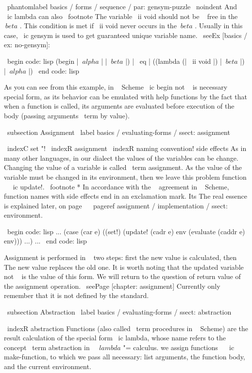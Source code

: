 {\ phantomlabel {basics / forms / sequence / par: gensym-puzzle}
\ noindent
And ~ \ ic {lambda} can also \ footnote {The variable \ ii {void} should not be ~ free
in the $ \ beta $ . This condition is met if \ ii {void} never occurs
in the $ \ beta $ . Usually in this case, \ ic {gensym} is used to get
guaranteed unique variable name. \ seeEx [basics / ex: no-gensym]}:

\ begin {code: lisp}
(begin | $ \ alpha $ | | $ \ beta $ |) | \ eq | ((lambda (| \ ii {void} |) | $ \ beta $ |) | $ \ alpha $ |)
\ end {code: lisp}

As you can see from this example, in ~ Scheme \ ic {begin} not ~ is necessary
special form, as its behavior can be emulated with help
functions by the fact that when a function is called, its arguments are evaluated before
execution of the body (passing arguments \ term {by value}).


\ subsection {Assignment} \ label {basics / evaluating-forms / ssect: assignment}

\ indexC {set "!}
\ indexR {assignment}
\ indexR {naming convention! side effects}
As in many other languages, in our dialect the values ​​of the variables can be
change. Changing the value of a variable is called \ term {assignment}. As
the value of the variable must be changed in its environment, then we leave this problem
function ~ \ ic {update!}. \ footnote * {In accordance with the ~ agreement in ~ Scheme,
function names with side effects end in an exclamation mark.} Its
The real essence is explained later, on
page ~ \ pageref {assignment / implementation / ssect: environment}.

\ begin {code: lisp}
... (case (car e)
      ((set!) (update! (cadr e) env
                       (evaluate (caddr e) env))) ...) ...
\ end {code: lisp}

Assignment is performed in ~ two steps: first the new value is calculated, then
The new value replaces the old one. It is worth noting that the updated variable
not ~ is the value of this form. We will return to the question of return
value of the assignment operation. \ seePage [chapter: assignment] Currently only
remember that it is not defined by the standard.


\ subsection {Abstraction} \ label {basics / evaluating-forms / ssect: abstraction}

\ indexR {abstraction}
Functions (also called \ term {procedures} in ~ Scheme) are the result
calculation of the special form \ ic {lambda}, whose name refers to the concept
\ term {abstraction} in ~ $ \ lambda $ "= calculus.
we assign functions ~ \ ic {make-function}, to which we pass all necessary: ​​list
arguments, the function body, and the current environment.

}
